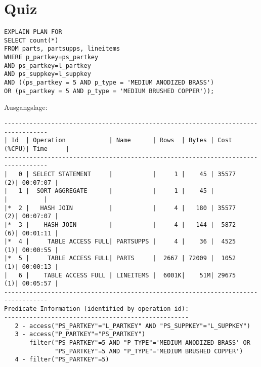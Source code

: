 \documentclass[10pt]{article}
\begin{document}
\section{Quiz}
\begin{lstlisting}[style=sql]
EXPLAIN PLAN FOR
SELECT count(*)
FROM parts, partsupps, lineitems
WHERE p_partkey=ps_partkey
AND ps_partkey=l_partkey
AND ps_suppkey=l_suppkey
AND ((ps_partkey = 5 AND p_type = 'MEDIUM ANODIZED BRASS')
OR (ps_partkey = 5 AND p_type = 'MEDIUM BRUSHED COPPER'));
\end{lstlisting}
\newline
Ausgangslage:
\begin{lstlisting}[style=queryexecutionplan]
----------------------------------------------------------------------------------
| Id  | Operation            | Name      | Rows  | Bytes | Cost (%CPU)| Time     |
----------------------------------------------------------------------------------
|   0 | SELECT STATEMENT     |           |     1 |    45 | 35577   (2)| 00:07:07 |
|   1 |  SORT AGGREGATE      |           |     1 |    45 |            |          |
|*  2 |   HASH JOIN          |           |     4 |   180 | 35577   (2)| 00:07:07 |
|*  3 |    HASH JOIN         |           |     4 |   144 |  5872   (6)| 00:01:11 |
|*  4 |     TABLE ACCESS FULL| PARTSUPPS |     4 |    36 |  4525   (1)| 00:00:55 |
|*  5 |     TABLE ACCESS FULL| PARTS     |  2667 | 72009 |  1052   (1)| 00:00:13 |
|   6 |    TABLE ACCESS FULL | LINEITEMS |  6001K|    51M| 29675   (1)| 00:05:57 |
----------------------------------------------------------------------------------
Predicate Information (identified by operation id):
--------------------------------------------------- 
   2 - access("PS_PARTKEY"="L_PARTKEY" AND "PS_SUPPKEY"="L_SUPPKEY")
   3 - access("P_PARTKEY"="PS_PARTKEY")
       filter("PS_PARTKEY"=5 AND "P_TYPE"='MEDIUM ANODIZED BRASS' OR 
              "PS_PARTKEY"=5 AND "P_TYPE"='MEDIUM BRUSHED COPPER')
   4 - filter("PS_PARTKEY"=5)
\end{lstlisting}
\end{document}
